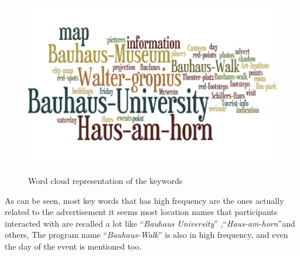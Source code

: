 \begin{figure}[H]
\centering
\includegraphics[width=12cm,height=8cm]{Figures/6/wordle}%
 \caption{Word cloud representation of the keywords}%
 \label{fig:wordle}%
\end{figure}

As can be seen, most key words that has high frequency are the ones actually related to the advertisement it seems most location names that participants interacted with are recalled a lot like ``\emph{Bauhaus University}'' ,``\emph{Haus-am-horn}''and others, The program name ``\emph{Bauhaus-Walk}'' is also in high frequency, and even the day of the event is mentioned too.


